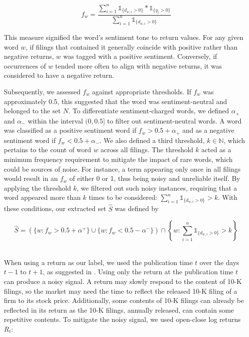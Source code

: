 \documentclass[logo,bsc,singlespacing,parskip]{infthesis}
\begin{document}
\begin{equation} \label{4.2}
f_w = \frac{\sum_{i=1}^{n} \mathbb{1}_{\{d_{w,i}>0\}} * \mathbb{1}_{\{y_i>0\}}}{\sum_{i=1}^{n} \mathbb{1}_{\{d_{w,i}>0\}}}
\end{equation}

This measure signified the word’s sentiment tone to return values. For any given word $w$, if filings that contained it generally coincide with positive rather than negative returns, $w$ was tagged with a positive sentiment. Conversely, if occurrences of $w$ tended more often to align with negative returns, it was considered to have a negative return. 

Subsequently, we assessed $f_w$ against appropriate thresholds. If $f_w$ was approximately 0.5, this suggested that the word was sentiment-neutral and belonged to the set $N$. To differentiate sentiment-charged words, we defined $\alpha_+$ and $\alpha_-$ within the interval $(0, 0.5]$ to filter out sentiment-neutral words. A word was classified as a positive sentiment word if  $f_w > 0.5+\alpha_+$ and as a negative sentiment word if  $f_w < 0.5+\alpha_-$. We also defined a third threshold, $k \in \mathbb{N}$, which pertains to the count of word $w$ across all filings. The threshold $k$ acted as a minimum frequency requirement to mitigate the impact of rare words, which could be sources of noise. For instance, a term appearing only once in all filings would result in an $f_w$ of either 0 or 1, thus being noisy and unreliable itself. By applying the threshold $k$, we filtered out such noisy instances, requiring that a word appeared more than $k$ times to be considered: ${\sum_{i=1}^{n} \mathbb{1}_{\{d_{w,i}>0\}}} > k$. With these conditions, our extracted set $\hat{S}$ was defined by

\begin{equation} \label{4.3}
\hat{S} = \left( \{w : f_w > 0.5 + \alpha^+\} \cup \{w : f_w < 0.5 - \alpha^-\} \right) \cap \left\{ w : \sum_{i=1}^{n} \mathbb{1}_{\{d_{w,i}>0\}} > k \right\}
\end{equation}

 \\
\label{subsubsubsec:return_calculation}
When using a return as our label, we used the publication time $t$ over the days $t - 1$ to $t +1$, as suggested in \cite{ke2020predicting}. Using only the return at the publication time $t$ can produce a noisy signal. A return may slowly respond to the content of 10-K filings, so the market may need the time to reflect the released 10-K filing of a firm to its stock price. Additionally, some contents of 10-K filings can already be reflected in its return as the 10-K filings, annually released, can contain some repetitive contents. To mitigate the noisy signal, we used open-close log returns
$R_t$:
\end{document}
